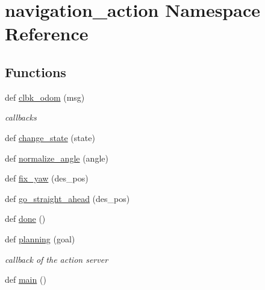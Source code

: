 \hypertarget{namespacenavigation__action}{}\section{navigation\+\_\+action Namespace Reference}
\label{namespacenavigation__action}
\subsection*{Functions}
\begin{DoxyCompactItemize}
\item 
def \hyperlink{namespacenavigation__action_a5843780136ed9def4e6c383d936ba03a}{clbk\+\_\+odom} (msg)
\begin{DoxyCompactList}\small\item\em callbacks \end{DoxyCompactList}\item 
def \hyperlink{namespacenavigation__action_a6d442ed74e58d2364dc836bf9070e294}{change\+\_\+state} (state)
\item 
def \hyperlink{namespacenavigation__action_a3d7bfdf0b3a4ceae6de2da2a2ca9216b}{normalize\+\_\+angle} (angle)
\item 
def \hyperlink{namespacenavigation__action_a66a81926b4ce0cf801c2a1e947dd2405}{fix\+\_\+yaw} (des\+\_\+pos)
\item 
def \hyperlink{namespacenavigation__action_a5984663372b3695a8566d9ab2b149728}{go\+\_\+straight\+\_\+ahead} (des\+\_\+pos)
\item 
def \hyperlink{namespacenavigation__action_a05d5b3c910a9327eceb1628bb0696e40}{done} ()
\item 
def \hyperlink{namespacenavigation__action_a2b437adab0003dc13c8703a505ba0640}{planning} (goal)
\begin{DoxyCompactList}\small\item\em callback of the action server \end{DoxyCompactList}\item 
def \hyperlink{namespacenavigation__action_a2203bb3f38935f8a73b3ef443dd4eec1}{main} ()
\end{DoxyCompactItemize}
